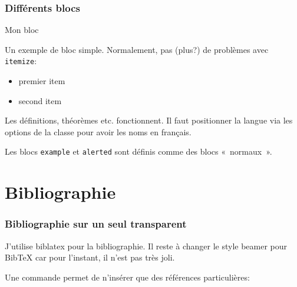 \documentclass[fr,biblatex]{isae-slides}
\begin{document}
\begin{frame}
\frametitle{Différents blocs}

\vfill

\begin{block}{Mon bloc}

Un exemple de bloc simple. Normalement, pas (plus?) de problèmes avec
\texttt{itemize}:

\begin{itemize}
\item premier item
\item second item
\end{itemize}  
\end{block}

\vfill

\begin{definition}[Ma définition]
Les définitions, théorèmes etc. fonctionnent. Il faut positionner la
langue via les options de la classe pour avoir les noms en français.
\end{definition}

\vfill

\begin{example}
Les blocs \texttt{example} et \texttt{alerted} sont définis comme des
blocs «~normaux~».
\end{example}

\vfill

\end{frame}

\section{Bibliographie}
\label{sec:biblio}

\begin{frame}
\frametitle{Bibliographie sur un seul transparent}

J'utilise biblatex pour la bibliographie. Il reste à changer le style
beamer pour BibTeX car pour l'instant, il n'est pas très joli.

Une commande permet de n'insérer que des références particulières:

\vspace{1cm}


\end{frame}
\end{document}
